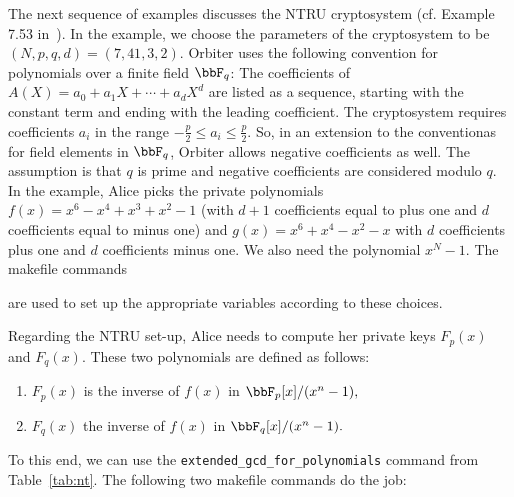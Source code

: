 \bigskip


The next sequence of examples discusses the NTRU cryptosystem 
(cf. Example 7.53 in~\cite{Hoffstein2014}).
In the example, we choose the parameters of the cryptosystem to be $(N,p,q,d) = (7,41,3,2).$
Orbiter uses the following convention for polynomials over a finite field $\bbF_q$: 
The coefficients of $A(X) = a_0 + a_1X + \cdots + a_dX^d$ 
are listed as a sequence, starting with the constant term and ending with the leading coefficient.
The cryptosystem requires coefficients $a_i$ in the range $-\frac{p}{2} \le a_i \le \frac{p}{2}.$ 
So, in an extension to the conventionas for field elements in $\bbF_q$, 
Orbiter allows negative coefficients as well. 
The assumption is that $q$ is prime and 
negative coefficients are considered modulo $q.$
In the example, Alice picks the private polynomials 
$f(x) = x^6-x^4+x^3+x^2-1$ (with $d+1$ coefficients equal to 
plus one and $d$ coefficients equal to minus one) and 
$g(x) = x^6+x^4-x^2-x$ with $d$ coefficients 
plus one and $d$ coefficients minus one.
We also need the polynomial $x^N-1$. 
The makefile commands 













are used to set up the appropriate variables according to these  choices. 

\bigskip


Regarding the NTRU set-up, Alice needs to compute her private keys 
$F_p(x)$ and $F_q(x).$ These two polynomials are defined as follows:
\begin{enumerate}
\item
	$F_p(x)$ is the inverse of $f(x)$ in $\bbF_p[x]/(x^n-1),$ 
\item
$F_q(x)$ the inverse of $f(x)$ in $\bbF_q[x]/(x^n-1).$
\end{enumerate}
To this end, we can use the \verb'extended_gcd_for_polynomials' 
command from Table~\ref{tab:nt}.
The following two makefile commands do the job: 





